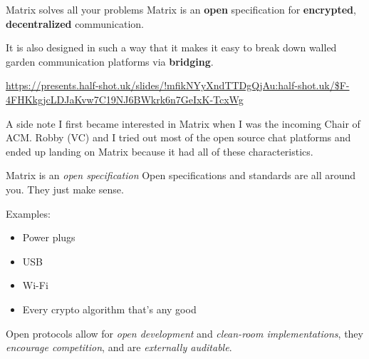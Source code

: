 \documentclass{acm}
\begin{document}
\begin{frame}{Matrix solves all your problems}
    Matrix is an \textbf{open} specification for \textbf{encrypted},
    \textbf{decentralized} communication. \pause

    It is also designed in such a way that it makes it easy to break down walled
    garden communication platforms via \textbf{bridging}.

    \centering
    \tiny
    \url{https://presents.half-shot.uk/slides/!mfikNYyXndTTDgQjAu:half-shot.uk/$F-4FHKkgjcLDJaKvw7C19NJ6BWkrk6n7GeIxK-TcxWg}
\end{frame}

\begin{frame}{A side note}
    I first became interested in Matrix when I was the incoming Chair of ACM.
    Robby (VC) and I tried out most of the open source chat platforms and ended
    up landing on Matrix because it had all of these characteristics.
\end{frame}

\begin{frame}{Matrix is an \textit{open specification}}
    Open specifications and standards are all around you. They just make
    sense\texttrademark.

    Examples:\pause
    \begin{itemize}
        \item Power plugs
        \item USB
        \item Wi-Fi
        \item Every crypto algorithm that's any good
    \end{itemize}
    \pause

    Open protocols allow for \textit{open development} and  \textit{clean-room
    implementations}, they \textit{encourage competition}, and are
    \textit{externally auditable}.
\end{frame}
\end{document}
